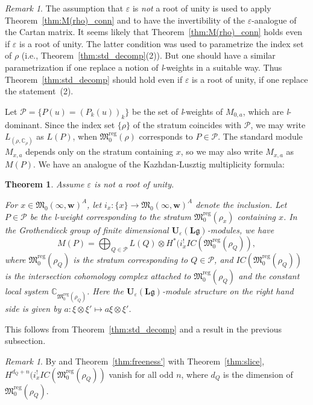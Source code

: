 \documentclass[12pt]{amsart}
\def\Bbb{\mathbb}
\def\frak{\mathfrak}
\newtheorem{Theorem}[equation]{Theorem}
\theoremstyle{definition}
\theoremstyle{remark}
\newtheorem{Remark}[equation]{Remark}
\numberwithin{equation}{subsection}
\newcommand{\thmref}[1]{Theorem~\ref{#1}}
\newcommand{\C}{{\Bbb C}}
\newcommand{\M}{{\frak M}} %
\newcommand{\Mreg}{{\frak M_0^{\operatorname{reg}}}}
\newcommand{\bw}{{\mathbf w}} %
\newcommand{\Ule}{{\mathbf U}_{\varepsilon}({\mathbf L}\mathfrak g)}
\begin{document}
\begin{Remark}\label{rem:root of unity}
The assumption that $\varepsilon$ is {\it not\/} a root of unity is
used to apply \thmref{thm:M(rho)_conn} and to have the invertibility
of the $\varepsilon$-analogue of the Cartan matrix.
%
It seems likely that \thmref{thm:M(rho)_conn} holds even if
$\varepsilon$ is a root of unity.
%
The latter condition was used to parametrize the index set of $\rho$
(i.e., \thmref{thm:std_decomp}(2)). But one should have a similar
parametrization if one replace a notion of {\it l\/}-weights in a
suitable way.
%
Thus \thmref{thm:std_decomp} should hold even if $\varepsilon$ is a
root of unity, if one replace the statement~(2).
\end{Remark}

Let $\mathcal P = \{ P(u) = (P_k(u))_k \}$ be the set of {\it
l\/}-weights of $M_{0,a}$, which are {\it l\/}-dominant.  Since the
index set $\{ \rho \}$ of the stratum coincides with $\mathcal P$, we
may write $L_{(\rho,\C_\rho)}$ as $L(P)$, when $\Mreg(\rho)$
corresponds to $P\in\mathcal P$. The standard module $M_{x,a}$ depends
only on the stratum containing $x$, so we may also write $M_{x,a}$ as
$M(P)$. We have an analogue of the Kazhdan-Lusztig multiplicity
formula:
\begin{Theorem}
Assume $\varepsilon$ is not a root of unity.

For $x\in \M_0(\infty,\bw)^A$, let $i_x\colon \{x\} \to
\M_0(\infty,\bw)^A$ denote the inclusion.
Let $P\in\mathcal P$ be the {\it l\/}-weight corresponding to the
stratum $\Mreg(\rho_x)$ containing $x$.
%
In the Grothendieck group of finite dimensional
$\Ule$-modules, we have
\begin{equation*}
   M(P) = \bigoplus_{Q\in\mathcal P} L(Q) \otimes
     H^*(i_x^! IC(\Mreg(\rho_Q)),
\end{equation*}
where $\Mreg(\rho_Q)$ is the stratum corresponding to $Q\in\mathcal
P$, and $IC(\Mreg(\rho_Q))$ is the intersection cohomology complex
attached to $\Mreg(\rho_Q)$ and the constant local system
$\C_{\Mreg(\rho_Q)}$.
%
Here the $\Ule$-module structure on the right hand side is given by
$a\colon \xi\otimes\xi'\mapsto a\xi\otimes \xi'$.
\end{Theorem}

This follows from \thmref{thm:std_decomp} and a result in the
previous subsection.

\begin{Remark}
By \cite[8.7.8]{Gi-book} and \thmref{thm:freeness'} with \thmref{thm:slice}, 
$H^{d_Q + n}(i_x^! IC(\Mreg(\rho_Q))$ 
vanish for all odd $n$, where $d_Q$ is the dimension of $\Mreg(\rho_Q)$.
\end{Remark}
\end{document}
